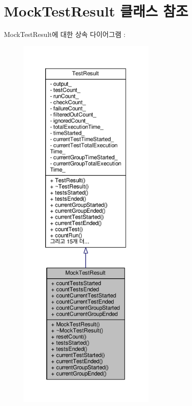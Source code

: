 \hypertarget{class_mock_test_result}{}\section{Mock\+Test\+Result 클래스 참조}
\label{class_mock_test_result}


Mock\+Test\+Result에 대한 상속 다이어그램 \+: 
\nopagebreak
\begin{figure}[H]
\begin{center}
\leavevmode
\includegraphics[height=550pt]{class_mock_test_result__inherit__graph}
\end{center}
\end{figure}


